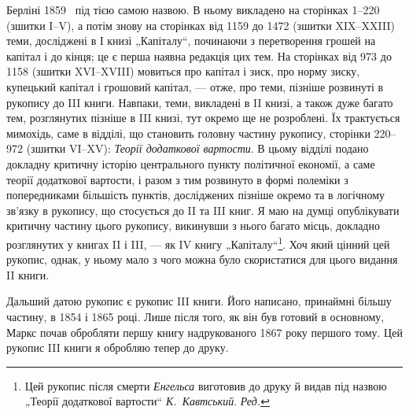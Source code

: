 \parcont{}  %
Берліні 1859~ під тією самою назвою. В ньому викладено на сторінках
1--220 (зшитки I--V), а потім знову на сторінках від 1159 до 1472
(зшитки XIX--XXIII) теми, досліджені в І книзі „Капіталу“, починаючи з
перетворення грошей на капітал і до кінця; це є перша наявна редакція
цих тем. На сторінках від 973 до 1158 (зшитки XVI--XVIII) мовиться
про капітал і зиск, про норму зиску, купецький капітал і грошовий капітал,
— отже, про теми, пізніше розвинуті в рукопису до III книги. Навпаки,
теми, викладені в II книзі, а також дуже багато тем, розглянутих
пізніше в III книзі, тут окремо ще не розроблені. Їх трактується мимохідь,
саме в відділі, що становить головну частину рукопису, сторінки
220--972 (зшитки VI--XV): \emph{Теорії додаткової вартости}. В цьому відділі
подано докладну критичну історію центрального пункту політичної
економії, а саме теорії додаткової вартости, і разом з тим розвинуто в
формі полеміки з попередниками більшість пунктів, досліджених пізніше
окремо та в логічному зв’язку в рукопису, що стосується до II та III
книг. Я маю на думці опублікувати критичну частину цього рукопису,
викинувши з нього багато місць, докладно розглянутих у книгах II і
III, — як IV книгу „Капіталу“\footnote*{
Цей рукопис після смерти \emph{Енгельса} виготовив до друку й видав під назвою
„Теорії додаткової вартости“ \emph{К.~Кавтський}. \emph{Ред.}
}. Хоч який цінний цей рукопис, однак, у
ньому мало з чого можна було скористатися для цього видання II книги.

Дальший датою рукопис є рукопис III книги. Його написано, принаймні
більшу частину, в 1854 і 1865 році. Лише після того, як він
був готовий в основному, Маркс почав обробляти першу книгу надрукованого
1867 року першого тому. Цей рукопис III книги я обробляю
тепер до друку.


